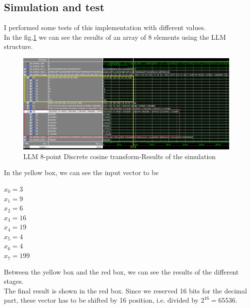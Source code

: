         
       
    \subsection{Simulation and test}
    I performed some tests of this implementation with different values. \\In the fig.\ref{tb_dct8} we can see the results of an array of 8 elements using the LLM structure.\\
    \bigskip
  \begin{figure}[h!]
              	\centering
              	\includegraphics[width=\textwidth]{imm/dct/tb_dct8.png} 	\caption{LLM 8-point Discrete cosine transform-Results of the simulation} 
              	\label{tb_dct8}
  \end{figure}
  \bigskip
  In the yellow box, we can see the input vector to be
  \begin{center}
  		$ x_{0}=3$\\
  		$ 	x_{1}=9 $\\
  		$ x_{2}=6 $ \\
  		$ x_{3}=16 $ \\
  		$ x_{4}=19 $ \\
  		$x_{5}=4$\\
  			$x_{6}=4$\\
  				$x_{7}=199$\\
  \end{center}
  Between the yellow box and the red box, we can see the results of the different stages.\\
  The final result is shown in the red box. Since we reserved 16 bits for the decimal part, these vector has to be shifted by 16 position, i.e. divided by $ 2^{16}=65536 $.
  
